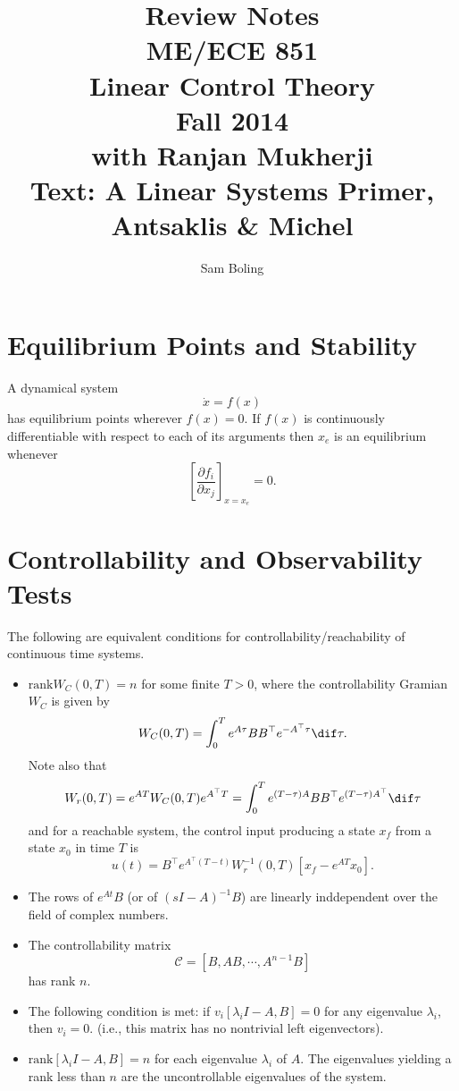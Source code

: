 \documentclass{article}
\author{Sam Boling}
\title{
  Review Notes \\
  ME/ECE 851 \\
  Linear Control Theory \\
  Fall 2014 \\
  with Ranjan Mukherji \\
  Text: A Linear Systems Primer, Antsaklis \& Michel
}
\begin{document}
\begin{titlepage}
\maketitle
\end{titlepage}

\section{Equilibrium Points and Stability}
A dynamical system
$$
\dot{x} = f(x)
$$
has equilibrium points wherever $f(x) = 0$. If $f(x)$ is continuously
differentiable with respect to each of its arguments then $x_e$ is an
equilibrium whenever
$$
\left[\frac{\partial f_i}{\partial x_j}\right]_{x = x_e} = 0.
$$

\section{Controllability and Observability Tests}

The following are equivalent conditions for
controllability/reachability of continuous time systems.
\begin{itemize}
  \item{
    $\mathrm{rank} W_C(0, T) = n$ for some finite $T > 0$,
    where the controllability Gramian $W_C$ is given by
    $$
    W_C(0, T) = \int_0^T e^{A \tau} B B^\top e^{-A^\top \tau} \dif \tau.
    $$
    Note also that
    $$
    W_r(0, T)
    = e^{A T} W_C(0, T) e^{A^\top T}
    = \int_0^T e^{(T - \tau)A} B B^\top e^{(T - \tau)A^\top} \dif \tau
    $$
    and for a reachable system, the control input producing a state $x_f$
    from a state $x_0$ in time $T$ is
    $$
    u(t) =
    B^\top e^{A^\top(T - t)} W_r^{-1}(0, T) [x_f - e^{A T} x_0].
    $$
  }
  \item{
    The rows of $e^{A t} B$ (or of $(sI - A)^{-1} B$) are linearly
    inddependent over the field of complex numbers.
  }
  \item{
    The controllability matrix
    $$
    \mathcal{C} = [B, A B, \cdots, A^{n-1} B]
    $$
    has rank $n$.
  }
  \item{
   The following condition is met: if $v_i [ \lambda_i I - A, B ] = 0$
   for any eigenvalue $\lambda_i$, then $v_i = 0$. (i.e., this matrix
   has no nontrivial left eigenvectors).
  }
  \item{
    $\mathrm{rank} [ \lambda_i I - A, B ] = n$ for each eigenvalue $\lambda_i$
    of $A$. The eigenvalues yielding a rank less than $n$ are the
    uncontrollable eigenvalues of the system.
  }
\end{itemize}
\end{document}
